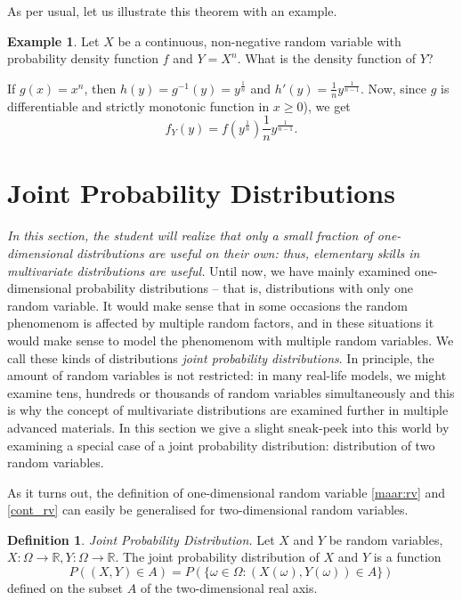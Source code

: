 \documentclass[12pt,a4paper,leqno]{report}
\newcommand{\R}{\mathbb{R}}
\theoremstyle{plain}
\theoremstyle{definition}
\newtheorem{maar}[equation]{Definition}
\newtheorem{esim}[equation]{Example}
\begin{document}
As per usual, let us illustrate this theorem with an example.

\begin{esim}
Let $X$ be a continuous, non-negative random variable with probability density function $f$ and $Y = X^n$. What is the density function of $Y$?

If $g(x) = x^n$, then $h(y) = g^{-1}(y) = y^{\frac{1}{n}}$ and $h'(y) = \frac{1}{n}y^{\frac{1}{n-1}}$. 
Now, since $g$ is differentiable and strictly monotonic function in $x \geq 0$), we get 
\[
f_Y(y) = f(y^{\frac{1}{n}})\frac{1}{n}y^{\frac{1}{n-1}}.
\]
\end{esim}


\section{Joint Probability Distributions}
\emph{In this section, the student will realize that only a small fraction of one-dimensional distributions are useful on their own: thus, elementary skills in multivariate distributions are useful.}
Until now, we have mainly examined one-dimensional probability distributions -- that is, distributions with only one random variable. It would make sense that in some occasions the random phenomenom is affected by multiple random factors, and in these situations it would make sense to model the phenomenom with multiple random variables. We call these kinds of distributions \emph{joint probability distributions}. In principle, the amount of random variables is not restricted: in many real-life models, we might examine tens, hundreds or thousands of random variables simultaneously and this is why the concept of multivariate distributions are examined further in multiple advanced materials. In this section we give a slight sneak-peek into this world by examining a special case of a joint probability distribution: distribution of two random variables. 

As it turns out, the definition of one-dimensional random variable \ref{maar:rv} and \ref{cont_rv} can easily be generalised for two-dimensional random variables.

\begin{maar}
\emph{Joint Probability Distribution.} Let $X$ and $Y$ be random variables, $X : \Omega \rightarrow \R, Y : \Omega\rightarrow \R$. The joint probability distribution of $X$ and $Y$ is a function
\[
P((X,Y) \in A) = P(\{ \omega \in \Omega : (X(\omega), Y(\omega)) \in A \})
\]
defined on the subset $A$ of the two-dimensional real axis.
\end{maar}
\end{document}
